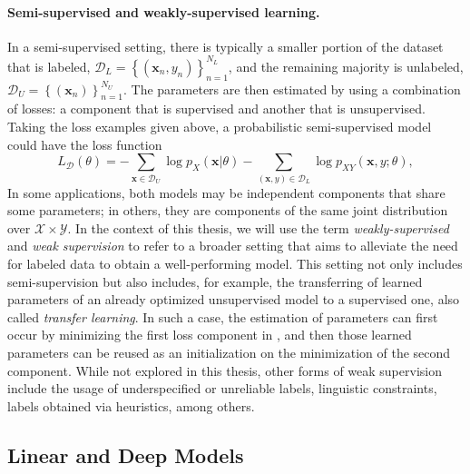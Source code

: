 \paragraph*{Semi-supervised and weakly-supervised learning.} In a
semi-supervised setting, there is typically a smaller portion of the
dataset that is labeled,
$\mathcal{D}_{L}=
    \left\{(\bm{x}_n,y_n)\right\}_{n=1}^{N_{L}}$,
and the remaining majority is unlabeled,
$\mathcal{D}_{U}=
    \left\{(\bm{x}_n)\right\}_{n=1}^{N_{U}}$.
The parameters are then estimated by using a combination of losses: a
component that is supervised and another that is unsupervised.
Taking the loss examples given above, a probabilistic semi-supervised model could
have the loss function
%
\begin{equation}
    L_{\mathcal D}\left(\theta\right)=
    -\sum_{\bm{x}\in\mathcal{D}_U}
    \log p_{X}\left(\bm{x}|\theta\right)
    -\sum_{(\bm{x},y)\in\mathcal{D}_L}
    \log p_{XY}\left(\bm{x}, y;\theta\right),
    \label{eq:semisup}
\end{equation}
%
In some applications,
both models may be independent components that share some
parameters; in others, they are components of the same joint distribution over
$\mathcal{X}\times\mathcal{Y}$.
In the context of this
thesis, we will use the term \textit{weakly-supervised} and
\textit{weak supervision} to refer to a broader setting that aims to
alleviate the need for labeled data to obtain a well-performing
model. This setting not only includes semi-supervision but also
includes, for example, the transferring of learned parameters of an
already optimized unsupervised model to a supervised one, also called
\textit{transfer learning}. In such a case, the estimation of
parameters can first occur by minimizing the first loss component in
, and then those learned parameters can be reused
as an initialization on the minimization of the second component.
While not explored in this thesis, other forms of weak supervision
include the usage of underspecified or unreliable labels, linguistic
constraints, labels obtained via heuristics, among others.

\subsection{Linear and Deep Models}

